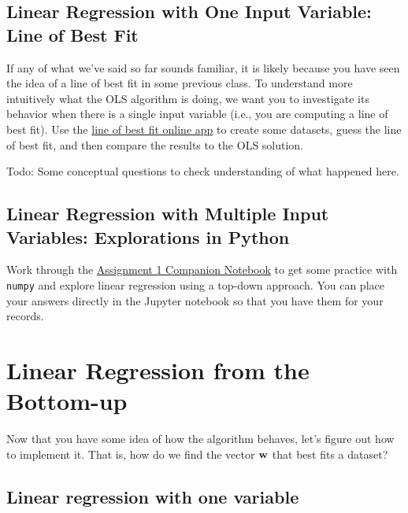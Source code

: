 \documentclass{tufte-handout}
\begin{document}
\subsection{Linear Regression with One Input Variable: Line of Best Fit}

If any of what we've said so far sounds familiar, it is likely because you have seen the idea of a line of best fit in some previous class.  To understand more intuitively what the OLS algorithm is doing, we want you to investigate its behavior when there is a single input variable (i.e., you are computing a line of best fit).  Use the \href{http://www.shodor.org/interactivate/activities/Regression/}{line of best fit online app} to create some datasets, guess the line of best fit, and then compare the results to the OLS solution.


\begin{exercise}
Todo: Some conceptual questions to check understanding of what happened here.
\end{exercise}



\subsection{Linear Regression with Multiple Input Variables: Explorations in Python}
Work through the \href{https://colab.research.google.com/drive/12pLbQkhrPoI-22FVV6gZNObi1IJCW-mF}{Assignment 1 Companion Notebook} to get some practice with {\tt numpy} and explore linear regression using a top-down approach.  You can place your answers directly in the Jupyter notebook so that you have them for your records.

\section{Linear Regression from the Bottom-up}

Now that you have some idea of how the algorithm behaves, let's figure out how to implement it.  That is, how do we find the vector $\mathbf{w}$ that best fits a dataset?

\subsection{Linear regression with one variable}
\end{document}
